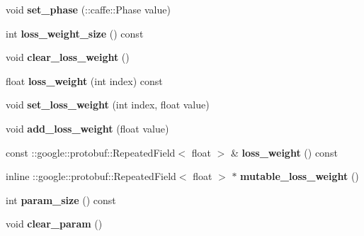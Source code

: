 \begin{DoxyCompactItemize}
void {\bfseries set\+\_\+phase} (\+::caffe\+::\+Phase value)
\item 
\mbox{\label{classcaffe_1_1_layer_parameter_ab27aa66b8c7925923090edc51551f91c}} 
int {\bfseries loss\+\_\+weight\+\_\+size} () const
\item 
\mbox{\label{classcaffe_1_1_layer_parameter_a694540cc07ef35b23a53c891b9df820f}} 
void {\bfseries clear\+\_\+loss\+\_\+weight} ()
\item 
\mbox{\label{classcaffe_1_1_layer_parameter_a8865cfdf9440e101edb42c477d3b3718}} 
float {\bfseries loss\+\_\+weight} (int index) const
\item 
\mbox{\label{classcaffe_1_1_layer_parameter_a7ce18911fa078a8237c9e0864031048b}} 
void {\bfseries set\+\_\+loss\+\_\+weight} (int index, float value)
\item 
\mbox{\label{classcaffe_1_1_layer_parameter_a0736120da0905132e3663b93c0d1a0bd}} 
void {\bfseries add\+\_\+loss\+\_\+weight} (float value)
\item 
\mbox{\label{classcaffe_1_1_layer_parameter_a8c76b34e8bf1415c2131ae5afc623890}} 
const \+::google\+::protobuf\+::\+Repeated\+Field$<$ float $>$ \& {\bfseries loss\+\_\+weight} () const
\item 
\mbox{\label{classcaffe_1_1_layer_parameter_a2b5d2e8537c8674218ecf3b40d1dc5d7}} 
inline \+::google\+::protobuf\+::\+Repeated\+Field$<$ float $>$ $\ast$ {\bfseries mutable\+\_\+loss\+\_\+weight} ()
\item 
\mbox{\label{classcaffe_1_1_layer_parameter_af313379bfa6468aa9c646f7c3e60e886}} 
int {\bfseries param\+\_\+size} () const
\item 
\mbox{\label{classcaffe_1_1_layer_parameter_afec13548d0f227a453b96ff97aee0254}} 
void {\bfseries clear\+\_\+param} ()
\item 
\mbox{\label{classcaffe_1_1_layer_parameter_a3be0134cd726e1c8f150370a17075031}} 

\end{DoxyCompactItemize}
